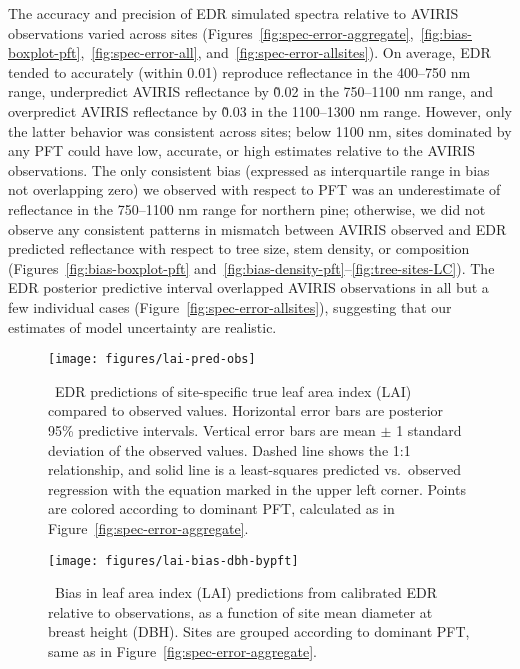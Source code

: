 The accuracy and precision of EDR simulated spectra relative to AVIRIS observations varied across sites (Figures~\ref{fig:spec-error-aggregate},~\ref{fig:bias-boxplot-pft},~\ref{fig:spec-error-all}, and~\ref{fig:spec-error-allsites}).
On average, EDR tended to accurately (within 0.01) reproduce reflectance in the 400--750 \unit{nm} range, underpredict AVIRIS reflectance by \~0.02 in the 750--1100 \unit{nm} range, and overpredict AVIRIS reflectance by \~0.03 in the 1100--1300 \unit{nm} range.
However, only the latter behavior was consistent across sites;
below 1100 \unit{nm}, sites dominated by any PFT could have low, accurate, or high estimates relative to the AVIRIS observations.\@
The only consistent bias (expressed as interquartile range in bias not overlapping zero) we observed with respect to PFT was an
underestimate of reflectance in the 750--1100 \unit{nm} range for northern pine;
otherwise, we did not observe any consistent patterns in mismatch between AVIRIS observed and EDR predicted reflectance with respect to tree size, stem density, or composition (Figures~\ref{fig:bias-boxplot-pft} and~\ref{fig:bias-density-pft}--\ref{fig:tree-sites-LC}).
The EDR posterior predictive interval overlapped AVIRIS observations in all but a few individual cases (Figure~\ref{fig:spec-error-allsites}), suggesting that our estimates of model uncertainty are realistic.

\begin{figure}
  \centering
  \texttt{[image: figures/lai-pred-obs]}
  \caption{\
    EDR predictions of site-specific true leaf area index (LAI) compared to observed values.
    Horizontal error bars are posterior 95\% predictive intervals.
    Vertical error bars are mean $\pm$ 1 standard deviation of the observed values.
    Dashed line shows the 1:1 relationship, and solid line is a least-squares predicted vs.\ observed regression with the equation marked in the upper left corner.
    Points are colored according to dominant PFT, calculated as in Figure~\ref{fig:spec-error-aggregate}.
  }\label{fig:lai-pred-obs}
\end{figure}

\begin{figure}
  \centering
  \texttt{[image: figures/lai-bias-dbh-bypft]}
  \caption{\
    Bias in leaf area index (LAI) predictions from calibrated EDR relative to observations,
    as a function of site mean diameter at breast height (DBH).
    Sites are grouped according to dominant PFT, same as in Figure~\ref{fig:spec-error-aggregate}.
  }\label{fig:lai-bias-dbh-bypft}
\end{figure}


